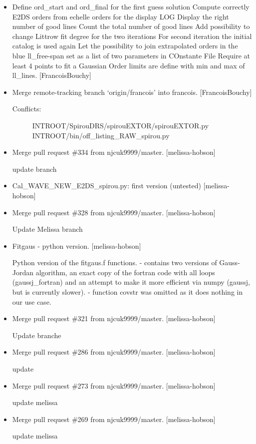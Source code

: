 \documentclass[a4paper,10pt,english]{report}
\begin{document}
\begin{itemize}
\item {} 
Define ord\_start and ord\_final for the first guess solution Compute
correctly E2DS orders from echelle orders for the display LOG Display
the right number of good lines Count the total number of good lines
Add possibility to change Littrow fit degree for the two iterations
For second iteration the initial catalog is used again Let the
possibility to join extrapolated orders in the blue ll\_free-span set
as a list of two parameters in COnstante File Require at least 4
points to fit a Gaussian Order limits are define with min and max of
ll\_lines. {[}FrancoisBouchy{]}

\item {} 
Merge remote-tracking branch ‘origin/francois’ into francois.
{[}FrancoisBouchy{]}
\begin{description}
\item[{Conflicts:}] \leavevmode
INTROOT/SpirouDRS/spirouEXTOR/spirouEXTOR.py
INTROOT/bin/off\_listing\_RAW\_spirou.py

\end{description}

\item {} 
Merge pull request \#334 from njcuk9999/master. {[}melissa-hobson{]}

update branch

\item {} 
Cal\_WAVE\_NEW\_E2DS\_spirou.py: first version (untested) {[}melissa-hobson{]}

\item {} 
Merge pull request \#328 from njcuk9999/master. {[}melissa-hobson{]}

Update Melissa branch

\item {} 
Fitgaus - python version. {[}melissa-hobson{]}

Python version of the fitgaus.f functions.
- contains two versions of Gauss-Jordan algorithm, an exact copy of the fortran code with all loops (gaussj\_fortran) and an attempt to make it more efficient via numpy (gaussj, but is currently slower).
- function covstr was omitted as it does nothing in our use case.

\item {} 
Merge pull request \#321 from njcuk9999/master. {[}melissa-hobson{]}

Update branche

\item {} 
Merge pull request \#286 from njcuk9999/master. {[}melissa-hobson{]}

update

\item {} 
Merge pull request \#273 from njcuk9999/master. {[}melissa-hobson{]}

update melissa

\item {} 
Merge pull request \#269 from njcuk9999/master. {[}melissa-hobson{]}

update melissa

\end{itemize}
\end{document}
